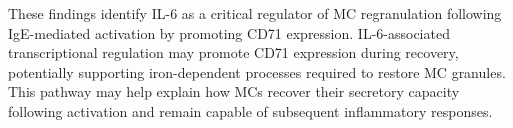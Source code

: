     {
    These findings identify IL-6 as a critical regulator of MC regranulation following IgE-mediated activation by promoting CD71 expression. IL-6-associated transcriptional regulation may promote CD71 expression during recovery, potentially supporting iron-dependent processes required to restore MC granules. This pathway may help explain how MCs recover their secretory capacity following activation and remain capable of subsequent inflammatory responses.
    }

    \newpage
    